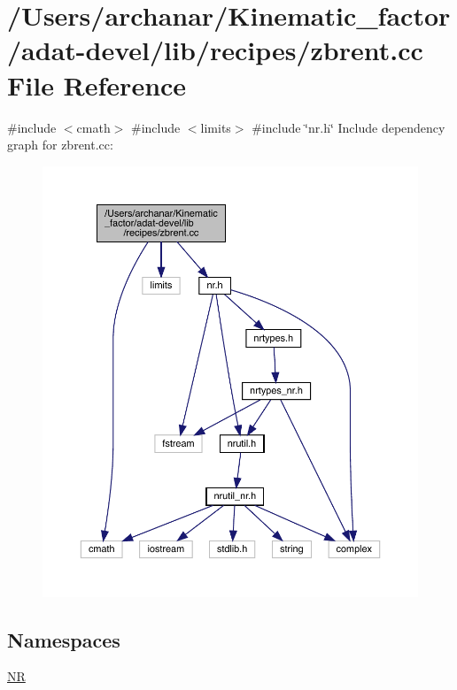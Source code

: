 \hypertarget{adat-devel_2lib_2recipes_2zbrent_8cc}{}\section{/\+Users/archanar/\+Kinematic\+\_\+factor/adat-\/devel/lib/recipes/zbrent.cc File Reference}
\label{adat-devel_2lib_2recipes_2zbrent_8cc}
{\ttfamily \#include $<$cmath$>$}\newline
{\ttfamily \#include $<$limits$>$}\newline
{\ttfamily \#include \char`\"{}nr.\+h\char`\"{}}\newline
Include dependency graph for zbrent.\+cc\+:
\nopagebreak
\begin{figure}[H]
\begin{center}
\leavevmode
\includegraphics[width=350pt]{de/ddd/adat-devel_2lib_2recipes_2zbrent_8cc__incl}
\end{center}
\end{figure}
\subsection*{Namespaces}
\begin{DoxyCompactItemize}
\item 
 \mbox{\hyperlink{namespaceNR}{NR}}
\end{DoxyCompactItemize}
